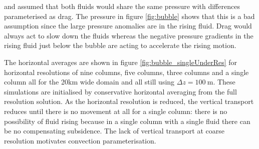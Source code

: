 \documentclass[draft]{agujournal2019}
\begin{document}
 and  assumed that both fluids would share
the same pressure with differences parameterised as drag. The pressure
in figure \ref{fig:bubble} shows that this is a bad assumption since
the large pressure anomalies are in the rising fluid. Drag would always
act to slow down the fluids whereas the negative pressure gradients
in the rising fluid just below the bubble are acting to accelerate
the rising motion. 

The horizontal averages are shown in figure \ref{fig:bubble_singleUnderRes}
for horizontal resolutions of nine columns, five columns, three columns
and a single column all for the 20km wide domain and all still using
$\Delta z=100\ \text{m}$. These simulations are initialised by conservative
horizontal averaging from the full resolution solution. As the horizontal
resolution is reduced, the vertical transport reduces until there
is no movement at all for a single column: there is no possibility
of fluid rising because in a single column with a single fluid there
can be no compensating subsidence. The lack of vertical transport
at coarse resolution motivates convection parameterisation. 
\end{document}
